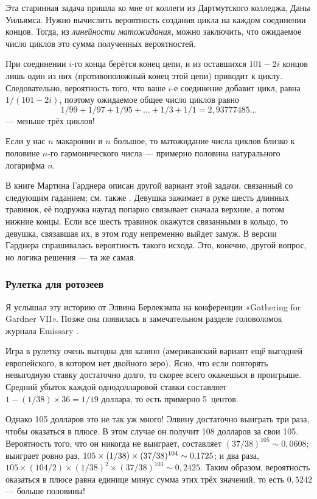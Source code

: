 Эта старинная задача пришла ко мне от коллеги из Дартмутского колледжа, Даны Уильямса.
Нужно вычислить вероятность создания цикла на каждом соединении концов.
Тогда, из \emph{линейности матожидания}, можно заключить, что ожидаемое число циклов это сумма полученных вероятностей.

При соединении $i$-го конца берётся конец цепи, и из оставшихся $101 - 2i$ концов лишь один из них (противоположный конец этой цепи) приводит к циклу.
Следовательно, вероятность того, что ваше $i$-е соединение добавит цикл, равна $1/(101 - 2i)$, поэтому ожидаемое общее число циклов равно 
\[1/99 + 1/97 + 1/95 +\dots + 1/3 + 1/1 = 2{,}93777485\dots\]
--- меньше трёх циклов!

Если у нас $n$ макаронин и $n$ большое, то матожидание числа циклов близко к половине $n$-го гармонического числа --- примерно половина натурального логарифма $n$.

\begin{addedbytheeditors}
В книге Мартина Гарднера \cite[p. 198]{26} описан другой вариант этой задачи, связанный со следующим гаданием; см. также \cite{meshalkin,bavrin-fribus}.
Девушка зажимает в руке шесть длинных травинок, её подружка наугад попарно связывает сначала верхние, а потом нижние концы.
Если все шесть травинок окажутся связанными в кольцо, то девушка, связавшая их, в этом году непременно выйдет замуж.
В версии Гарднера спрашивалась вероятность такого исхода.
Это, конечно, другой вопрос, но логика решения --- та же самая. \pr
    
\end{addedbytheeditors}

\subsubsection*{Рулетка для ротозеев}

Я услышал эту историю от Элвина Берлекэмпа на конференции «Gathering for Gardner VII».
Позже она появилась в замечательном разделе головоломок журнала Emissary \cite[весна/осень 2006 года]{3}.

Игра в рулетку очень выгодна для казино (американский вариант ещё выгодней европейского, в котором нет двойного зеро).
Ясно, что если повторять невыгодную ставку достаточно долго, то скорее всего окажешься в проигрыше.
Средний убыток каждой однодолларовой ставки составляет $1 - (1/38) \times 36 = 1/19$ доллара, то есть примерно 5~центов.

Однако 105 долларов это не так уж много!
Элвину достаточно выиграть три раза, чтобы оказаться в плюсе.
В этом случае он получит 108 долларов за свои 105.
Вероятность того, что он никогда не выиграет, составляет $(37/38)^{105} \sim 0{,}0608$;
выиграет ровно раз, $105 \times (1/38) \times (37/38)^{104} \z\sim 0{,}1725$;
и два раза, $105 \times (104/2) \times (1/38)^2 \times (37/38)^{103} \sim 0{,}2425$.
Таким образом, вероятность оказаться в плюсе равна единице минус сумма этих трёх значений, то есть $0{,}5242$ --- больше половины!

